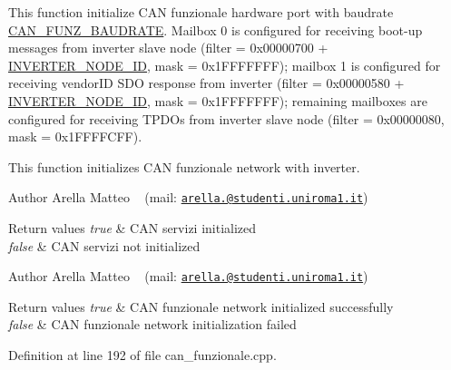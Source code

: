 This function initialize C\+AN funzionale hardware port with baudrate \mbox{\hyperlink{common_8h_adee7e3800c996a5a977034531d94570d}{C\+A\+N\+\_\+\+F\+U\+N\+Z\+\_\+\+B\+A\+U\+D\+R\+A\+TE}}. Mailbox 0 is configured for receiving boot-\/up messages from inverter slave node (filter = 0x00000700 + \mbox{\hyperlink{group___c_a_n__funzionale__group_ga59ea82aec4abe07072cbdad555a8c1b9}{I\+N\+V\+E\+R\+T\+E\+R\+\_\+\+N\+O\+D\+E\+\_\+\+ID}}, mask = 0x1\+F\+F\+F\+F\+F\+FF); mailbox 1 is configured for receiving vendor\+ID S\+DO response from inverter (filter = 0x00000580 + \mbox{\hyperlink{group___c_a_n__funzionale__group_ga59ea82aec4abe07072cbdad555a8c1b9}{I\+N\+V\+E\+R\+T\+E\+R\+\_\+\+N\+O\+D\+E\+\_\+\+ID}}, mask = 0x1\+F\+F\+F\+F\+F\+FF); remaining mailboxes are configured for receiving T\+P\+D\+Os from inverter slave node (filter = 0x00000080, mask = 0x1\+F\+F\+F\+F\+C\+FF). 

This function initializes C\+AN funzionale network with inverter.

\begin{DoxyAuthor}{Author}
Arella Matteo ~\newline
 (mail\+: \href{mailto:arella.1646983@studenti.uniroma1.it}{\tt arella.@studenti.\+uniroma1.\+it})
\end{DoxyAuthor}

\begin{DoxyRetVals}{Return values}
{\em true} & C\+AN servizi initialized \\
\hline
{\em false} & C\+AN servizi not initialized\\
\hline
\end{DoxyRetVals}
\begin{DoxyAuthor}{Author}
Arella Matteo ~\newline
 (mail\+: \href{mailto:arella.1646983@studenti.uniroma1.it}{\tt arella.@studenti.\+uniroma1.\+it})
\end{DoxyAuthor}

\begin{DoxyRetVals}{Return values}
{\em true} & C\+AN funzionale network initialized successfully \\
\hline
{\em false} & C\+AN funzionale network initialization failed \\
\hline
\end{DoxyRetVals}


Definition at line 192 of file can\+\_\+funzionale.\+cpp.

\mbox{\label{group___c_a_n__funzionale__group_gaf1acdfa5537f47656edd6ffa3e7c24bd}} 
